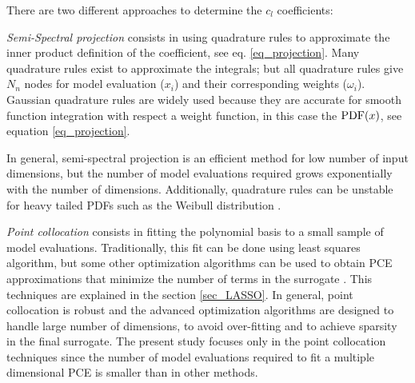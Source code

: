 \documentclass[preprint,12pt]{elsarticle}
\begin{document}






There are two different approaches to determine the $c_l$ coefficients:

\emph{Semi-Spectral projection} consists in using quadrature rules to approximate the inner product definition of the coefficient, see eq. \ref{eq_projection}. Many quadrature rules exist to approximate the integrals; but all quadrature rules give $N_n$ nodes for model evaluation ($x_i$) and their corresponding weights ($\omega_i$). Gaussian quadrature rules are widely used because they are accurate for smooth function integration with respect a weight function, in this case the $\mathrm{PDF}(x)$, see equation \ref{eq_projection}.


\noindent In general, semi-spectral projection is an efficient method for low number of input dimensions, but the number of model evaluations required grows exponentially with the number of dimensions. Additionally, quadrature rules can be unstable for heavy tailed PDFs such as the Weibull distribution \cite{gautschi1994algorithm}.

\emph{Point collocation} consists in fitting the polynomial basis to a small sample of model evaluations. Traditionally, this fit can be done using least squares algorithm, but some other optimization algorithms can be used to obtain PCE approximations that minimize the number of  terms in the surrogate \cite{blatman2011adaptive,pedregosa2011scikit,tibshirani1996regression}. This techniques are explained in the section \ref{sec_LASSO}. In general, point collocation is robust and the advanced optimization algorithms are designed to handle large number of dimensions, to avoid over-fitting and to achieve sparsity in the final surrogate. The present study focuses only in the point collocation techniques since the number of model evaluations required to fit a multiple dimensional PCE is smaller \cite{blatman2011adaptive} than in other methods.
\end{document}
